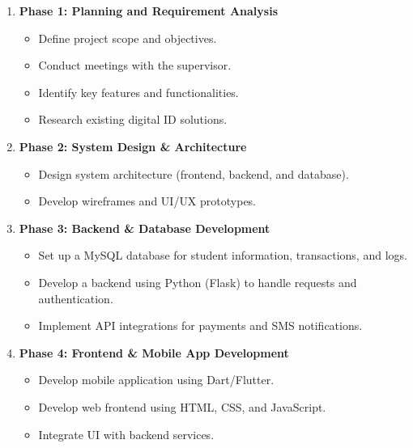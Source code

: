 \documentclass[a4paper,14pt]{article}
\begin{document}
{{{{{		\vspace{0.5cm}
		
			{
			\noindent \normalsize
			\justifying \begin{enumerate}
				\item \textbf{Phase 1: Planning and Requirement Analysis }
				\begin{itemize}
					\item Define project scope and objectives.
					\item Conduct meetings with the supervisor.
					\item Identify key features and functionalities.
					\item Research existing digital ID solutions.
				\end{itemize}
				
				\item \textbf{Phase 2: System Design \& Architecture }
				\begin{itemize}
					\item Design system architecture (frontend, backend, and database).
					\item Develop wireframes and UI/UX prototypes.
				\end{itemize}
				
				\item \textbf{Phase 3: Backend \& Database Development }
				\begin{itemize}
					\item Set up a MySQL database for student information, transactions, and logs.
					\item Develop a backend using Python (Flask) to handle requests and authentication.
					\item Implement API integrations for payments and SMS notifications.
				\end{itemize}
				
				\item \textbf{Phase 4: Frontend \& Mobile App Development }
				\begin{itemize}
					\item Develop mobile application using Dart/Flutter.
					\item Develop web frontend using HTML, CSS, and JavaScript.
					\item Integrate UI with backend services.
				\end{itemize}
				

\end{enumerate}}}}}}}
\end{document}
